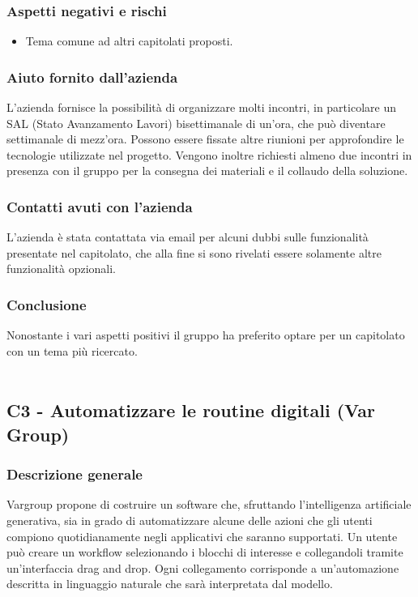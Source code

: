 \documentclass[10pt]{article}
\begin{document}
\subsubsection{Aspetti negativi e rischi}
\begin{itemize}
\item Tema comune ad altri capitolati proposti.
\end{itemize}
\subsubsection{Aiuto fornito dall'azienda}
L’azienda fornisce la possibilità di organizzare molti incontri, in particolare un SAL (Stato Avanzamento Lavori) bisettimanale di un’ora, che può diventare settimanale di mezz’ora. Possono essere fissate altre riunioni per approfondire le tecnologie utilizzate nel progetto. Vengono inoltre richiesti almeno due incontri in presenza con il gruppo per la consegna dei materiali e il collaudo della soluzione.

\subsubsection{Contatti avuti con l'azienda}
L’azienda è stata contattata via email per alcuni dubbi sulle funzionalità presentate nel capitolato, che alla fine si sono rivelati essere solamente altre funzionalità opzionali.

\subsubsection{Conclusione}
Nonostante i vari aspetti positivi il gruppo ha preferito optare per un capitolato con un tema più ricercato.
\\\\
\subsection{C3 - Automatizzare le routine digitali (Var Group)}
\subsubsection{Descrizione generale}
Vargroup propone di costruire un software che, sfruttando l’intelligenza artificiale generativa, sia in grado di automatizzare alcune delle azioni che gli utenti compiono quotidianamente negli applicativi che saranno supportati. Un utente può creare un workflow selezionando i blocchi di interesse e collegandoli tramite un’interfaccia drag and drop. Ogni collegamento corrisponde a un'automazione descritta in linguaggio naturale che sarà interpretata dal modello.
\end{document}
